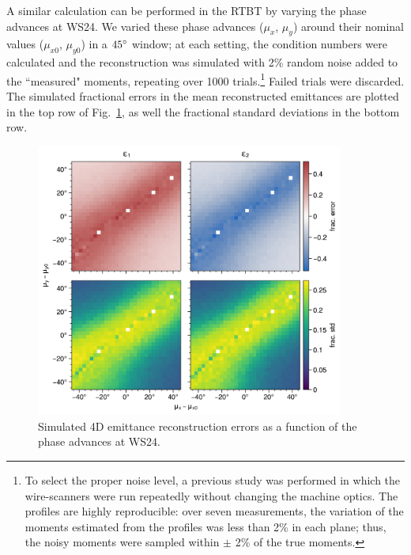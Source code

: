 A similar calculation can be performed in the RTBT by varying the phase advances at WS24. We varied these phase advances ($\mu_x$, $\mu_y$) around their nominal values ($\mu_{x0}$, $\mu_{y0}$) in a $45\degree$ window; at each setting, the condition numbers were calculated and the reconstruction was simulated with 2\% random noise added to the ``measured" moments, repeating over 1000 trials.\footnote{To select the proper noise level, a previous study was performed in which the wire-scanners were run repeatedly without changing the machine optics. The profiles are highly reproducible: over seven measurements, the variation of the moments estimated from the profiles was less than 2\% in each plane; thus, the noisy moments were sampled within $\pm$ 2\% of the true moments.} Failed trials were discarded. The simulated fractional errors in the mean reconstructed emittances are plotted in the top row of Fig.~\ref{fig:rtbt_montecarlo_emittances}, as well the fractional standard deviations in the bottom row. 
%
\begin{figure}[!p]
    \centering
    \includegraphics[width=0.9\textwidth]{Images/chapter4/rtbt_montecarlo_emittances.png}
    \caption{Simulated 4D emittance reconstruction errors as a function of the phase advances at WS24.}
    \label{fig:rtbt_montecarlo_emittances}
\end{figure}
%
